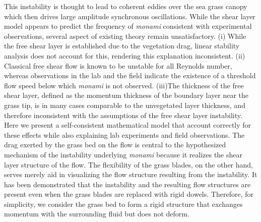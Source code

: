 \documentclass[aps,prl,twocolumn,superscriptaddress,10pt]{revtex4-1}  %
\newcommand{\monami}{\textit{monami }}
\begin{document}
This instability is thought to lead to coherent eddies over the sea grass canopy which then drives large amplitude synchronous oscillations.
\newline
While the shear layer model appears to predict the frequency of \monami consistent with experimental observations, several aspect of existing theory remain unsatisfactory. 
(i) While the free shear layer is established due to the vegetation drag, linear stability analysis\cite{Raupach96} does not account for this, rendering this explanation inconsistent. 
(ii) Classical free shear flow is known to be unstable for all Reynolds number\cite{drazin}, whereas observations in the lab\cite{Ghisal02} and the field\cite{Grizzle96} indicate the existence of a threshold 
flow speed below which \monami is not observed. 
(iii)The thickness of the free shear layer, defined as the momentum thickness of the boundary layer near the grass tip, is in many cases comparable to the unvegetated layer thickness,
and therefore inconsistent with the assumptions of the free shear layer instability.
Here we present a self-consistent mathematical model that account correctly for these effects 
while also explaining lab experiments and field observations.
\newline
The drag exerted by the grass bed on the flow is central to the hypothesized mechanism\cite{Ghisal02} of the instability underlying \monami because it realizes the shear layer structure of the flow. 
The flexibility of the grass blades, on the other hand, serves merely aid in visualizing the flow structure resulting from the instability\cite{Nepf2012}. 
It has been demonstrated that the instability and the resulting flow structures are present even when the grass blades are replaced with rigid dowels\cite{Ghisal02}. 
Therefore, for simplicity, we consider the grass bed to form a rigid structure that exchanges momentum with the surrounding fluid but does not deform. 
\end{document}
